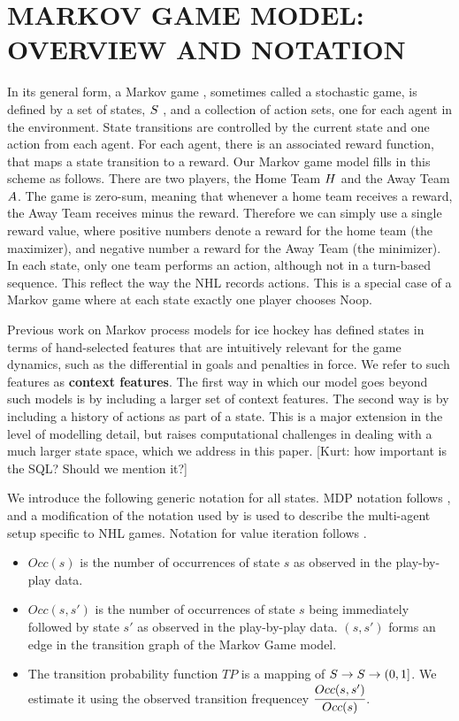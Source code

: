 \documentclass[]{article}
\begin{document}
\section{MARKOV GAME MODEL: OVERVIEW AND NOTATION}
In its general form, a Markov game \citep{Littman1994}, sometimes called a
stochastic game, is defined by a set of states, $S$ , and a collection of action sets, one for each agent in the environment. State transitions are controlled
by the current state and one action from each agent. For each agent, there is an associated reward function, that maps a state transition to a reward. Our Markov game model fills in this scheme as follows. There are two players, the Home Team $H$ and the Away Team $A$. The game is zero-sum, meaning that whenever a home team receives a reward, the Away Team receives minus the reward. Therefore we can simply use a single reward value, where positive numbers denote a reward for the home team (the maximizer), and negative number a reward for the Away Team (the minimizer). In each state, only one team performs an action, although not in a turn-based sequence. This reflect the way the NHL records actions. This is a special case of a Markov game where at each state exactly one player chooses Noop.


Previous work on Markov process models for ice hockey \citep{Thomas2013} has defined states in terms of hand-selected features that are intuitively relevant for the game dynamics, such as the differential in goals and  penalties in force. We refer to such features as \textbf{context features}. The first way in which our model goes beyond such models is by including a larger set of context features. The second way is by including a history of actions as part of a state. This is a major extension in the level of modelling detail, but raises computational challenges in dealing with a much larger state space, which we address in this paper.
[Kurt: how important is the SQL? Should we mention it?]

We introduce the following generic notation for all states. MDP notation follows \citep{Russell2010}, and a modification of the notation used by \citep{Littman1994} is used to describe the multi-agent setup specific to NHL games. Notation for value iteration follows \citep{Mitchell1997}.

\begin{itemize}
\item $Occ(s)$ is the number of occurrences of state $s$ as observed in the play-by-play data.
\item $Occ(s,s')$ is the number of occurrences of state $s$ being immediately followed by state $s'$ as observed in the play-by-play data. $(s,s')$ forms an edge in the transition graph of the Markov Game model.
\item The transition probability function $TP$ is a mapping of $S \rightarrow S \rightarrow (0,1]$. We estimate it using the observed transition frequencey $\cfrac{Occ(s,s')}{Occ(s)}$.
\end{itemize}
\end{document}
